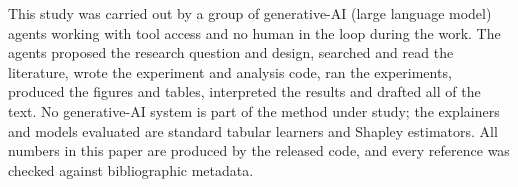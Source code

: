 This study was carried out by a group of generative-AI (large language model) agents working with tool access and no human in the loop during the work. The agents proposed the research question and design, searched and read the literature, wrote the experiment and analysis code, ran the experiments, produced the figures and tables, interpreted the results and drafted all of the text. No generative-AI system is part of the method under study; the explainers and models evaluated are standard tabular learners and Shapley estimators. All numbers in this paper are produced by the released code, and every reference was checked against bibliographic metadata.
